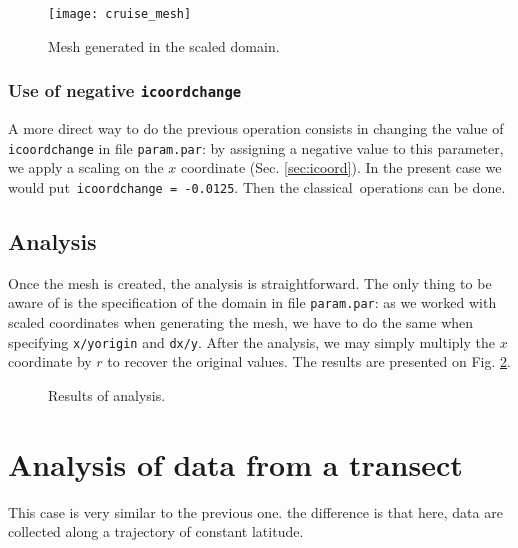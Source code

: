\begin{figure}[H]
\centering
\texttt{[image: cruise\_mesh]}
\caption{Mesh generated in the scaled domain.\label{fig:mesh}}
\end{figure}

\subsubsection{Use of negative \texttt{icoordchange}}

A more direct way to do the previous operation consists in changing the value of \texttt{icoord\-change} in file \texttt{param.par}: by assigning a negative value to this parameter, we apply a scaling on the $x$ coordinate (Sec. \ref{sec:icoord}). In the present case we would put\, \texttt{icoordchange = -0.0125}. Then the classical \diva\,operations can be done.



\subsection{Analysis}

Once the mesh is created, the analysis is straightforward. The only thing to be aware of is the specification of the domain in file \texttt{param.par}: as we worked with scaled coordinates when generating the mesh, we have to do the same when specifying \texttt{x/yorigin} and \texttt{dx/y}. After the analysis, we may simply multiply the $x$ coordinate by $r$ to recover the original values. The results are presented on Fig. \ref{fig:analysis}.  

 
\begin{figure}[htpb]
\centering
{}
\caption{Results of analysis.\label{fig:analysis}}
\end{figure}





\section{Analysis of data from a transect}

This case is very similar to the previous one. the difference is that here, data are collected along a trajectory of constant latitude.
